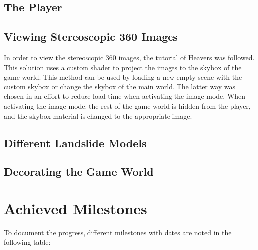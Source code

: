    \subsection{The Player}
    
    \subsection{Viewing Stereoscopic 360 Images}
        In order to view the stereoscopic 360 images, the tutorial of Heavers\cite{skybox_images} was followed. This solution uses a custom shader to project the images to the skybox of the game world. This method can be used by loading a new empty scene with the custom skybox or change the skybox of the main world. The latter way was chosen in an effort to reduce load time when activating the image mode. When activating the image mode, the rest of the game world is hidden from the player, and the skybox material is changed to the appropriate image.
        
    
    \subsection{Different Landslide Models}
    
    \subsection{Decorating the Game World}

\section{Achieved Milestones}
    To document the progress, different milestones with dates are noted in the following table:
    
